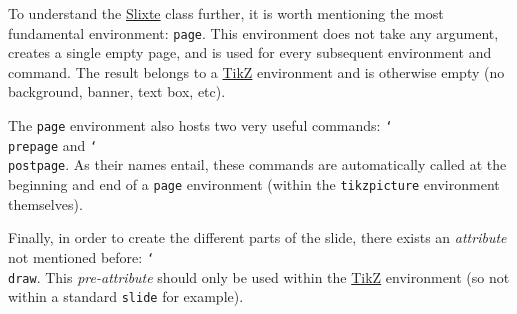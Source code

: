 \documentclass{slixte}
\def\clsurl{https://ctan.org/pkg/slixte}
\newcommand{\codetext}[1]{\texttt{\color{second}#1}}
\newcommand{\cmdt}[1]{\char`\\#1}
\newcommand{\cbrl}{\char`\{}
\newcommand{\cbrr}{\char`\}}
\newcommand{\cbrt}[1]{\cbrl#1\cbrr}
\newcommand{\codeline}[2][0]{\spacing[0.1]\hspace{-1.2cm}\codetext{\foreach\i in {0,...,#1}{~~~~}#2}\par}
\newcommand{\sptm}[1]{\textit{\color{third}#1}}
\newcommand{\slixte}{\href{\clsurl}{\color{first}Slixte}}
\newcommand{\tikzref}{\href{https://en.wikipedia.org/wiki/PGF/TikZ}{\color{first}TikZ}}
\begin{document}
\begin{slide}
    To understand the \slixte{} class further, it is worth mentioning the most fundamental environment: \codetext{page}.
    This environment does not take any argument, creates a single empty page, and is used for every subsequent environment and command.
    The result belongs to a \tikzref{} environment and is otherwise empty (no background, banner, text box, etc).

    \spacing[1]

    The \codetext{page} environment also hosts two very useful commands: \codetext{\cmdt{prepage}} and \codetext{\cmdt{postpage}}.
    As their names entail, these commands are automatically called at the beginning and end of a \codetext{page} environment (within the \codetext{tikzpicture} environment themselves).

    \spacing[1]

    Finally, in order to create the different parts of the slide, there exists an \sptm{attribute} not mentioned before: \codetext{\cmdt{draw}}.
    This \sptm{pre-attribute} should only be used within the \tikzref{} environment (so not within a standard \codetext{slide} for example).
\end{slide}

\iftoggle{examples}{
\begin{slide}[Fundamental environment (example)]
    Try the following code in your document.

    \spacing

    \codeline{\cmdt{renewcommand}\cbrt{\cmdt{backpage}}\cbrl}
    \codeline[1]{\cmdt{node}[third, scale=5] at (15, 10)\cbrt{Background};}
    \codeline{\cbrr}
    \codeline{\cmdt{renewcommand}\cbrt{\cmdt{frontpage}}\cbrl}
    \codeline[1]{\cmdt{node}[scale=5] at (15, 5)\cbrt{Foreground};}
    \codeline[1]{\cmdt{node}\cbrt{\cmdt{includegraphics}[height=5cm]\cbrt{background.png}};}
    \codeline{\cbrr}
    \codeline{\cmdt{begin}\cbrt{page}\cmdt{end}\cbrt{page}}
    \codeline{\cmdt{begin}\cbrt{slide}\cmdt{end}\cbrt{slide}}
\end{slide}
}{}
\end{document}
